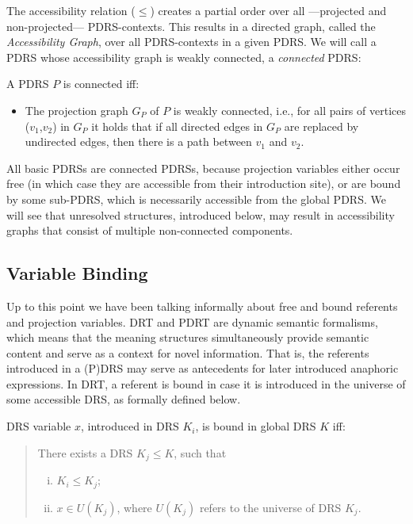 The accessibility relation ($\leq$) creates a partial order over all
---projected and non-projected--- PDRS-contexts. This results in a directed
graph, called the \textit{Accessibility Graph}, over all PDRS-contexts in
a given PDRS. We will call a PDRS whose accessibility graph is weakly
connected, a \emph{connected} PDRS:

\begin{definition}[Connectedness]
  A PDRS $P$ is connected iff:
  \begin{itemize}
    \item The projection graph $G_P$ of $P$ is weakly connected, i.e., for
      all pairs of vertices ($v_1$,$v_2$) in $G_P$ it holds that if all
      directed edges in $G_P$ are replaced by undirected edges, then there is
      a path between $v_1$ and $v_2$.  
  \end{itemize}
\end{definition}

\noindent All basic PDRSs are connected PDRSs, because projection variables
either occur free (in which case they are accessible from their introduction
site), or are bound by some sub-PDRS, which is necessarily accessible from
the global PDRS. We will see that unresolved structures, introduced below,
may result in accessibility graphs that consist of multiple non-connected
components.


\subsection{Variable Binding}

Up to this point we have been talking informally about free and bound
referents and projection variables. DRT and PDRT are dynamic semantic
formalisms, which means that the meaning structures simultaneously provide
semantic content and serve as a context for novel information. That is, the
referents introduced in a (P)DRS may serve as antecedents for later
introduced anaphoric expressions. In DRT, a referent is bound in case it is
introduced in the universe of some accessible DRS, as formally defined below.

\begin{definition}
DRS variable $x$, introduced in DRS $K_i$, is bound in global DRS $K$ iff:
\begin{quote}
There exists a DRS $K_j \leq K$, such that
\begin{enumerate}[i.]
  \item $K_i \leq K_j$;
  \item $x\in U(K_j)$, where $U(K_j)$ refers to the universe of DRS $K_j$.
\end{enumerate}
\end{quote}
\end{definition}

